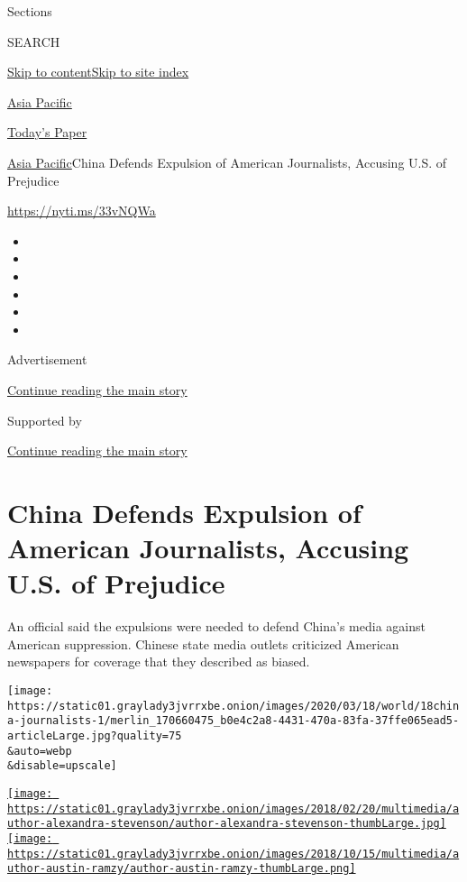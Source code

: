 Sections

SEARCH

\protect\hyperlink{site-content}{Skip to
content}\protect\hyperlink{site-index}{Skip to site index}

\href{https://www.nytimes3xbfgragh.onion/section/world/asia}{Asia
Pacific}

\href{https://myaccount.nytimes3xbfgragh.onion/auth/login?response_type=cookie\&client_id=vi}{}

\href{https://www.nytimes3xbfgragh.onion/section/todayspaper}{Today's
Paper}

\href{/section/world/asia}{Asia Pacific}\textbar{}China Defends
Expulsion of American Journalists, Accusing U.S. of Prejudice

\url{https://nyti.ms/33vNQWa}

\begin{itemize}
\item
\item
\item
\item
\item
\item
\end{itemize}

Advertisement

\protect\hyperlink{after-top}{Continue reading the main story}

Supported by

\protect\hyperlink{after-sponsor}{Continue reading the main story}

\hypertarget{china-defends-expulsion-of-american-journalists-accusing-us-of-prejudice}{%
\section{China Defends Expulsion of American Journalists, Accusing U.S.
of
Prejudice}\label{china-defends-expulsion-of-american-journalists-accusing-us-of-prejudice}}

An official said the expulsions were needed to defend China's media
against American suppression. Chinese state media outlets criticized
American newspapers for coverage that they described as biased.

\texttt{[image: https://static01.graylady3jvrrxbe.onion/images/2020/03/18/world/18china-journalists-1/merlin\_170660475\_b0e4c2a8-4431-470a-83fa-37ffe065ead5-articleLarge.jpg?quality=75\\\&auto=webp\\\&disable=upscale]}

\href{https://www.nytimes3xbfgragh.onion/by/alexandra-stevenson}{\texttt{[image: https://static01.graylady3jvrrxbe.onion/images/2018/02/20/multimedia/author-alexandra-stevenson/author-alexandra-stevenson-thumbLarge.jpg]}}\href{https://www.nytimes3xbfgragh.onion/by/austin-ramzy}{\texttt{[image: https://static01.graylady3jvrrxbe.onion/images/2018/10/15/multimedia/author-austin-ramzy/author-austin-ramzy-thumbLarge.png]}}


